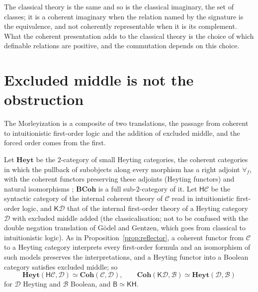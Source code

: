 \documentclass[11pt]{amsart}
\theoremstyle{definition}
\newcommand{\Coh}{\mathbf{Coh}}
\newcommand{\BCoh}{\mathbf{BCoh}}
\newcommand{\BB}{\mathsf B}
\newcommand{\cC}{\mathcal C}
\newcommand{\cD}{\mathcal D}
\begin{document}
The classical theory is the same and so is the classical imaginary, the
set of classes; it is a coherent imaginary when the relation named by
the signature is the equivalence, and not coherently representable when
it is its complement. What the coherent presentation adds to the
classical theory is the choice of which definable relations are
positive, and the commutation depends on this choice.

\section{Excluded middle is not the obstruction}\label{sec:heyting}

The Morleyization is a composite of two translations, the passage from
coherent to intuitionistic first-order logic and the addition of
excluded middle, and the forced order comes from the first.

Let $\mathbf{Heyt}$ be the $2$-category of small Heyting categories,
the coherent categories in which the pullback of subobjects along every
morphism has a right adjoint $\forall_f$, with the coherent functors
preserving these adjoints (Heyting functors) and natural isomorphisms
\cite[A1.4]{Elephant}; $\BCoh$ is a full sub-$2$-category of it. Let
$\mathsf H\cC$ be the syntactic category of the internal coherent theory
of $\cC$ read in intuitionistic first-order logic, and $\mathsf K\cD$
that of the internal first-order theory of a Heyting category $\cD$
with excluded middle added (the classicalisation; not to be confused
with the double negation translation of G\"odel and Gentzen, which
goes from classical to intuitionistic logic). As in
Proposition~\ref{prop:reflector}, a coherent functor from $\cC$ to a
Heyting category interprets every first-order formula and an
isomorphism of such models preserves the interpretations, and a Heyting
functor into a Boolean category satisfies excluded middle; so
\[
\mathbf{Heyt}(\mathsf H\cC,\cD)\simeq\Coh(\cC,\cD),\qquad
\Coh(\mathsf K\cD,\mathcal B)\simeq\mathbf{Heyt}(\cD,\mathcal B)
\]
for $\cD$ Heyting and $\mathcal B$ Boolean, and $\BB\simeq\mathsf
K\mathsf H$.
\end{document}
